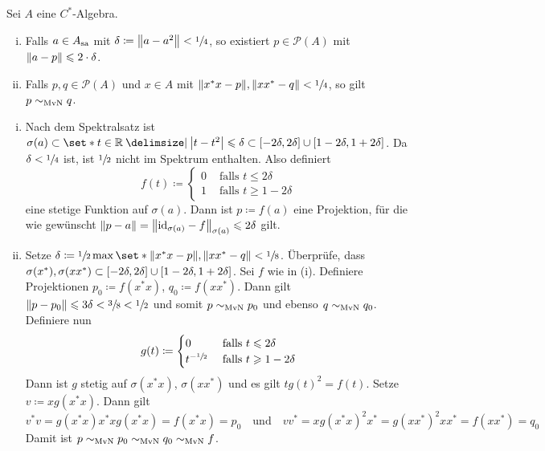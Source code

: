 \begin{lemma}[label=lem:712]
	Sei $A$ eine $C^*$-Algebra.
	\begin{enumerate}[(i)]
		\item Falls $a \in A_\sa$ mit $\delta \coloneqq \norm*{a-a^2}< \sfrac{1}{4}$, so existiert $p \in \mathcal{P}(A)$ mit $\norm*{a-p} \le 2 \cdot \delta$.
		\item Falls $p,q \in \mathcal{P}(A)$ und $x \in A$ mit $\norm*{x^*x -p}, \norm*{xx^* -q} < \sfrac{1}{4}$, so gilt $p \sim_{\MvN} q$.
	\end{enumerate}
\end{lemma}
\begin{beweis}
	\begin{enumerate}[(i)]
		\item Nach dem Spektralsatz ist $\sigma(a) \subset \set*{t \in \mathbb{R} \given \abs*{t-t^2} \le \delta } \subset \benbrace*{-2 \delta, 2 \delta} \cup \benbrace*{1- 2 \delta, 1+ 2 \delta}$.
		Da $\delta < \sfrac{1}{4}$  ist, ist $\sfrac{1}{2}$ nicht im Spektrum enthalten. Also definiert 
		\[
			f(t) \coloneqq \begin{cases}
				0 &\text{ falls }t \le 2 \delta\\
				1 &\text{ falls } t \ge 1- 2 \delta
			\end{cases}
		\]
		eine stetige Funktion auf $\sigma(a)$.
		Dann ist $p \coloneqq f(a)$ eine Projektion, für die wie gewünscht $\norm*{p-a} = \norm*{{\id_{\sigma(a)}} -f}_{\sigma(a)} \le 2 \delta$ gilt.
		\item Setze $\delta \coloneqq \sfrac{1}{2} \max \set*{\norm*{x^*x -p}, \norm*{xx^* -q}} < \sfrac{1}{8}$.
		Überprüfe, dass $\sigma(x^*), \sigma(xx^*) \subset \benbrace*{-2 \delta, 2 \delta} \cup \benbrace*{1- 2 \delta, 1+2\delta}$.
		Sei $f$ wie in (i).
		Definiere Projektionen $p_0 \coloneqq f(x^*x)$, $q_0 \coloneqq f(xx^*)$.
		Dann gilt $\norm*{p-p_0} \le 3 \delta< \sfrac{3}{8} < \sfrac{1}{2}$ und somit $p \sim_{\MvN} p_0$ und ebenso $q \sim_{\MvN} q_0$.
		Definiere nun 
		\[
			g(t) \coloneqq \begin{cases}
				0 &\text{ falls }t \le 2 \delta\\
				t^{-\sfrac{1}{2}} &\text{ falls } t \ge 1 - 2 \delta
			\end{cases}
		\]
		Dann ist $g$ stetig auf $\sigma(x^*x)$, $\sigma(xx^*)$ und es gilt $t g(t)^2 = f(t)$.
		Setze $v \coloneqq x g(x^*x)$.
		Dann gilt 
		\[
			v^* v = g(x^*x) x^*x g(x^*x) = f(x^*x) = p_0 \quad \text{und} \quad  vv^* = x g(x^*x)^2 x^* = g(xx^*)^2 xx^* = f(xx^*) = q_0
		\]
		Damit ist $p \sim_{\MvN} p_0 \sim_{\MvN} q_0 \sim_{\MvN} f$.\qedhere
	\end{enumerate}
\end{beweis}

